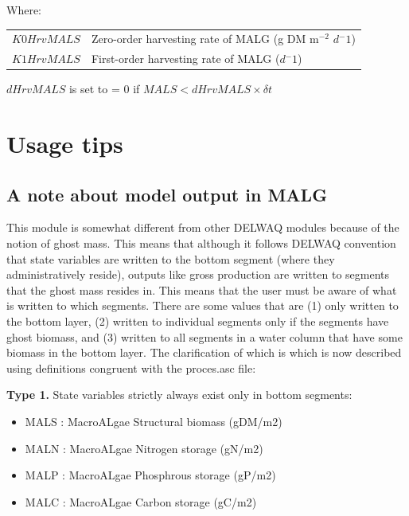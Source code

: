 \documentclass{deltares_manual}
\begin{document}
Where:\\

\begin{tabular}{ll}
	$K0HrvMALS$ & Zero-order harvesting rate of MALG (g DM m$^{-2}$ $d{^-1}$)\\
	$K1HrvMALS$ & First-order harvesting rate of MALG ($d{^-1}$)\\
\end{tabular}

$dHrvMALS$ is set to = 0 if $MALS < dHrvMALS\times \delta t$
 
\pagebreak

\chapter{Usage tips}
\section{A note about model output in MALG}
This module is somewhat different from other DELWAQ modules because of the notion of ghost mass. This means that although it follows DELWAQ convention that state variables are written to the bottom segment (where they administratively reside), outputs like gross production are written to segments that the ghost mass resides in. This means that the user must be aware of what is written to which segments. There are some values that are (1) only written to the bottom layer, (2) written to individual segments only if the segments have ghost biomass, and (3) written to all segments in a water column that have some biomass in the bottom layer. The clarification of which is which is now described using definitions congruent with the proces.asc file:

\textbf{Type 1.} State variables strictly always exist only in bottom segments:
\begin{itemize}
	\item MALS     : MacroALgae Structural biomass                          (gDM/m2)        
	\item MALN     : MacroALgae Nitrogen storage                            (gN/m2)       
	\item MALP     : MacroALgae Phosphrous storage                          (gP/m2)       
	\item MALC     : MacroALgae Carbon storage                              (gC/m2)  
\end{itemize}
\end{document}
